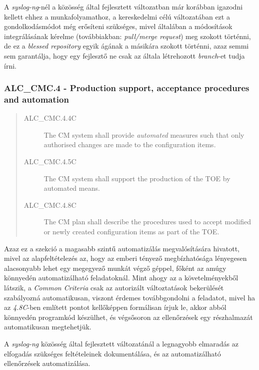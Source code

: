 A \emph{syslog-ng}-nél a közösség által fejlesztett változatban már korábban igazodni kellett ehhez
a munkafolyamathoz, a kereskedelmi célú változatában ezt a gondolkodásmódot még erősíteni szükséges,
mivel általában a módosítások integrálásának kérelme (továbbiakban: \emph{pull/merge request}) meg
szokott történni, de ez a \emph{blessed repository} egyik ágának a másikára szokott történni, azaz
semmi sem garantálja, hogy egy fejlesztő ne csak az általa létrehozott \emph{branch}-et tudja írni.

\pagebreak[1]
\subsubsection{ALC\_CMC.4 - Production support, acceptance procedures and automation }
\begin{quote}
    \begin{description}
        \item[ALC\_CMC.4.4C]{The CM system shall provide \emph{automated} measures such that only
            authorised changes are made to the configuration items.}
        \item[ALC\_CMC.4.5C]{The CM system shall support the production of the TOE by
            automated means.}
        \item[ALC\_CMC.4.8C]{The CM plan shall describe the procedures used to accept
            modified or newly created configuration items as part of the TOE.}
    \end{description}
\end{quote}

Azaz ez a szekció a magasabb szintű automatizálás megvalósítására hivatott, mivel az
alapfeltételezés az, hogy az emberi tényező megbízhatósága lényegesen alacsonyabb lehet egy
megegyező munkát végző géppel, főként az amúgy könnyedén automatizálható feladatoknál.  Mint ahogy
az a követelményekből látszik, a \emph{Common Criteria} csak az autorizált változtatások bekerülését
szabályozná automatikusan, viszont érdemes továbbgondolni a feladatot, mivel ha az \emph{4.8C}-ben
említett pontot kellőképpen formálisan írjuk le, akkor abból könnyedén programkód készülhet, és
végsősoron az ellenőrzések egy részhalmazát automatikusan megtehetjük.

A \emph{syslog-ng} közösség által fejlesztett változatánál a legnagyobb elmaradás az elfogadás
szükséges feltételeinek dokumentálása, és az automatizálható ellenőrzések automatizálása.

